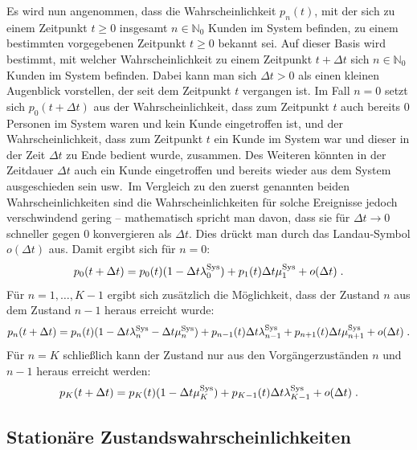 \documentclass[a4paper,11pt,oneside]{article}
\theoremstyle{definition}
\begin{document}
Es wird nun angenommen, dass die Wahrscheinlichkeit $p_n(t)$, mit der sich zu einem Zeitpunkt $t\ge0$ insgesamt $n\in\mathbb{N}_0$ Kunden im System befinden, zu einem bestimmten vorgegebenen Zeitpunkt $t\ge0$ bekannt sei. Auf dieser Basis wird bestimmt, mit welcher Wahrscheinlichkeit zu einem Zeitpunkt $t+\Delta t$ sich $n\in\mathbb{N}_0$ Kunden im System befinden. Dabei kann man sich $\Delta t>0$ als einen kleinen Augenblick vorstellen, der seit dem Zeitpunkt $t$ vergangen ist. Im Fall $n=0$ setzt sich $p_0(t+\Delta t)$ aus der Wahrscheinlichkeit, dass zum Zeitpunkt $t$ auch bereits 0 Personen im System waren und kein Kunde eingetroffen ist, und der Wahrscheinlichkeit, dass zum Zeitpunkt $t$ ein Kunde im System war und dieser in der Zeit $\Delta t$ zu Ende bedient wurde, zusammen. Des Weiteren könnten in der Zeitdauer $\Delta t$ auch ein Kunde eingetroffen und bereits wieder aus dem System ausgeschieden sein usw.\ Im Vergleich zu den zuerst genannten beiden Wahrscheinlichkeiten sind die Wahrscheinlichkeiten für solche Ereignisse jedoch verschwindend gering -- mathematisch spricht man davon, dass sie für $\Delta t\to0$ schneller gegen 0 konvergieren als $\Delta t$. Dies drückt man durch das Landau-Symbol $o(\Delta t)$ aus. Damit ergibt sich für $n=0$:
$$
p_0(t+\Delta t)=
p_0(t)(1-\Delta t\lambda_0^{\rm Sys})+p_1(t)\Delta t\mu_1^{\rm Sys}+o(\Delta t)\;.
$$
Für $n=1,\ldots,K-1$ ergibt sich zusätzlich die Möglichkeit, dass der Zustand $n$ aus dem Zustand $n-1$ heraus erreicht wurde:
$$
p_n(t+\Delta t)=
p_n(t)(1-\Delta t\lambda_n^{\rm Sys}-\Delta t\mu_n^{\rm Sys})+p_{n-1}(t)\Delta t\lambda_{n-1}^{\rm Sys}+p_{n+1}(t)\Delta t\mu_{n+1}^{\rm Sys}+o(\Delta t)\;.
$$
Für $n=K$ schließlich kann der Zustand nur aus den Vorgängerzuständen $n$ und $n-1$ heraus erreicht werden:
$$
p_K(t+\Delta t)=
p_K(t)(1-\Delta t\mu_K^{\rm Sys})+p_{K-1}(t)\Delta t\lambda_{K-1}^{\rm Sys}+o(\Delta t)\;.
$$

\subsection{Stationäre Zustandswahrscheinlichkeiten}
\end{document}
